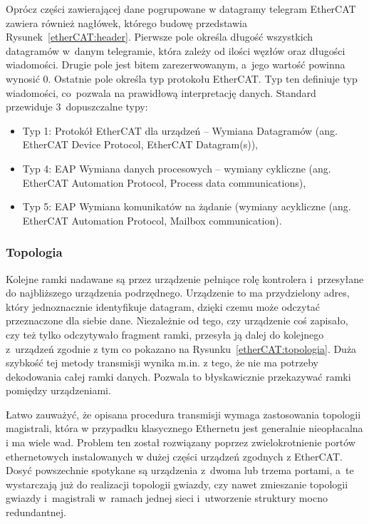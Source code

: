 
Oprócz części zawierającej dane pogrupowane w datagramy telegram EtherCAT zawiera również nagłówek, którego budowę  przedstawia Rysunek~\ref{etherCAT:header}. Pierwsze pole określa długość wszystkich datagramów w~danym telegramie, która zależy od ilości węzłów oraz długości wiadomości. Drugie pole jest bitem zarezerwowanym, a~jego wartość powinna wynosić 0. Ostatnie pole określa typ protokołu EtherCAT. Typ ten definiuje typ wiadomości, co~pozwala na prawidłową interpretację danych.
Standard przewiduje 3~dopuszczalne typy:
\begin{itemize}
\item Typ 1: Protokół EtherCAT dla urządzeń -- Wymiana Datagramów (ang. EtherCAT Device Protocol, EtherCAT Datagram(s)),
\item Typ 4: EAP Wymiana danych procesowych -- wymiany cykliczne (ang. EtherCAT Automation Protocol, Process data communications),
\item Typ 5: EAP Wymiana komunikatów na żądanie (wymiany acykliczne (ang. EtherCAT Automation Protocol, Mailbox communication).
\end{itemize}

\subsubsection{Topologia}
Kolejne ramki nadawane są przez urządzenie pełniące rolę kontrolera i~przesyłane do najbliższego urządzenia podrzędnego. Urządzenie to ma przydzielony adres, który jednoznacznie identyfikuje datagram, dzięki czemu może odczytać przeznaczone dla siebie dane. Niezależnie od tego, czy urządzenie coś zapisało, czy też tylko odczytywało fragment ramki, przesyła ją dalej do kolejnego z~urządzeń zgodnie z tym co pokazano na Rysunku~\ref{etherCAT:topologia}. Duża szybkość tej metody transmisji wynika m.in. z tego, że nie ma potrzeby dekodowania całej ramki danych. Pozwala to błyskawicznie przekazywać ramki pomiędzy urządzeniami.


Łatwo zauważyć, że opisana procedura transmisji wymaga zastosowania topologii magistrali, która w przypadku klasycznego Ethernetu jest generalnie nieopłacalna i ma wiele wad. Problem ten został rozwiązany poprzez zwielokrotnienie portów ethernetowych instalowanych w dużej części urządzeń zgodnych z EtherCAT.
Dosyć powszechnie spotykane są urządzenia z~dwoma lub trzema portami, a~te wystarczają już do realizacji topologii gwiazdy, czy nawet zmieszanie topologii gwiazdy i~magistrali w~ramach jednej sieci i~utworzenie struktury mocno redundantnej.

